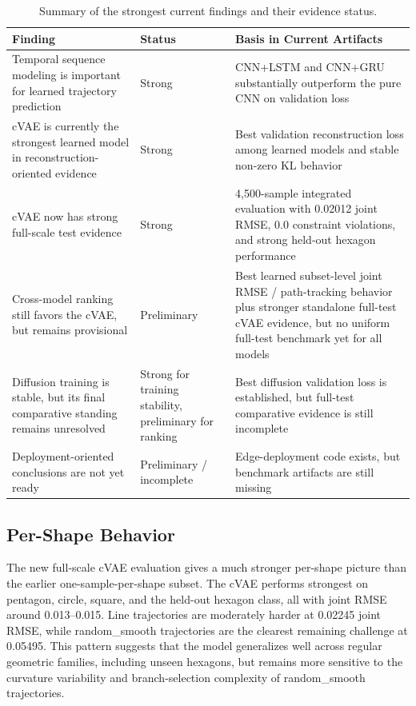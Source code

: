 \documentclass[11pt]{article}
\begin{document}
\begin{table}[h]
\centering
\caption{Summary of the strongest current findings and their evidence status.}
\label{tab:findings_summary}
\begin{tabular}{p{5.5cm}p{2.2cm}p{6.1cm}}
\toprule
Finding & Status & Basis in Current Artifacts \\
\midrule
Temporal sequence modeling is important for learned trajectory prediction & Strong & CNN+LSTM and CNN+GRU substantially outperform the pure CNN on validation loss \\
cVAE is currently the strongest learned model in reconstruction-oriented evidence & Strong & Best validation reconstruction loss among learned models and stable non-zero KL behavior \\
cVAE now has strong full-scale test evidence & Strong & 4,500-sample integrated evaluation with 0.02012 joint RMSE, 0.0 constraint violations, and strong held-out hexagon performance \\
Cross-model ranking still favors the cVAE, but remains provisional & Preliminary & Best learned subset-level joint RMSE / path-tracking behavior plus stronger standalone full-test cVAE evidence, but no uniform full-test benchmark yet for all models \\
Diffusion training is stable, but its final comparative standing remains unresolved & Strong for training stability, preliminary for ranking & Best diffusion validation loss is established, but full-test comparative evidence is still incomplete \\
Deployment-oriented conclusions are not yet ready & Preliminary / incomplete & Edge-deployment code exists, but benchmark artifacts are still missing \\
\bottomrule
\end{tabular}
\end{table}

\subsection{Per-Shape Behavior}

The new full-scale cVAE evaluation gives a much stronger per-shape picture than the earlier one-sample-per-shape subset. The cVAE performs strongest on pentagon, circle, square, and the held-out hexagon class, all with joint RMSE around 0.013--0.015. Line trajectories are moderately harder at 0.02245 joint RMSE, while random\_smooth trajectories are the clearest remaining challenge at 0.05495. This pattern suggests that the model generalizes well across regular geometric families, including unseen hexagons, but remains more sensitive to the curvature variability and branch-selection complexity of random\_smooth trajectories.
\end{document}
